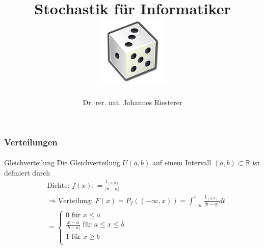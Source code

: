 \documentclass{beamer}
\begin{document}
\title[Stochastik] %
{Stochastik für Informatiker
\\
\includegraphics[scale=0.5]{img/craps}
}
\subtitle{}
\author[Dr. Johannes Riesterer] %
{Dr.  rer. nat. Johannes Riesterer}

\date[KPT 2004] %
{}

\subject{Stochastik}

\frame{\titlepage}




\begin{frame}
    \frametitle{Verteilungen}
\framesubtitle{}

\begin{block}{Gleichverteilung}
Die Gleichverteilung $U{(a,b)}$ auf einem Intervall $(a,b) \subset \mathbb{R}$ ist definiert durch
\begin{align*}
& \text{Dichte: } f (x) : = \frac{1_{(a,b)}}{|b-a| } \\
& \Rightarrow \text{Verteilung: } F (x) =  P_f( (-\infty, x))  =  \int_{-\infty}^{x} \frac{1_{(a,b)}}{|b-a|} dt\\\
& = \begin {cases} 0 \text{ für } x \leq a \\   \frac{x-a}{|b-a|} \text{ für } a \leq x \leq b \\ 1 \text{ für }  x \geq b \\  \end{cases}
\end{align*}
\end{block}

 \end{frame}
\end{document}
